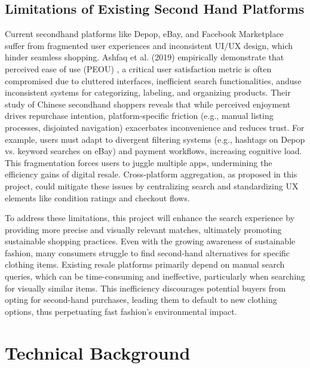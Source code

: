 \documentclass[10pt,twocolumn]{article}
\begin{document}
\subsection{Limitations of Existing Second Hand Platforms}
Current secondhand platforms like Depop, eBay, and Facebook Marketplace suffer from fragmented user experiences and inconsistent UI/UX design, which hinder seamless shopping. Ashfaq et al. (2019) \cite{ashfaq2019} empirically demonstrate that perceived ease of use (PEOU) , a critical  user satisfaction metric is often compromised due to cluttered interfaces, inefficient search functionalities, anduse inconsistent systems for categorizing, labeling, and organizing products. Their study of Chinese secondhand shoppers reveals that while perceived enjoyment drives repurchase intention, platform-specific friction (e.g., manual listing processes, disjointed navigation) exacerbates inconvenience and reduces trust. For example, users must adapt to divergent filtering systems (e.g., hashtags on Depop vs. keyword searches on eBay) and payment workflows, increasing cognitive load. This fragmentation forces users to juggle multiple apps, undermining the efficiency gains of digital resale. Cross-platform aggregation, as proposed in this project, could mitigate these issues by centralizing search and standardizing UX elements like condition ratings and checkout flows.

To address these limitations, this project will enhance the search experience by providing more precise and visually relevant matches, ultimately promoting sustainable shopping practices. Even with the growing awareness of sustainable fashion, many consumers struggle to find second-hand alternatives for specific clothing items. Existing resale platforms primarily depend on manual search queries, which can be time-consuming and ineffective, particularly when searching for visually similar items. This inefficiency discourages potential buyers from opting for second-hand purchases, leading them to default to new clothing options, thus perpetuating fast fashion's environmental impact.


\section{Technical Background}
\end{document}
